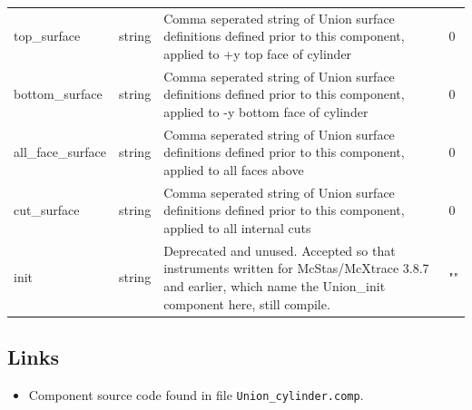 \begin{longtable}{p{}p{}p{}p{}}
top\_surface & string & Comma seperated string of Union surface definitions defined prior to this component, applied to +y top face of cylinder & 0 \\
bottom\_surface & string & Comma seperated string of Union surface definitions defined prior to this component, applied to -y bottom face of cylinder & 0 \\
all\_face\_surface & string & Comma seperated string of Union surface definitions defined prior to this component, applied to all faces above & 0 \\
cut\_surface & string & Comma seperated string of Union surface definitions defined prior to this component, applied to all internal cuts & 0 \\
init & string & Deprecated and unused. Accepted so that instruments written for McStas/McXtrace 3.8.7 and earlier, which name the Union\_init component here, still compile. & "" \\
\bottomrule
\end{longtable}

\subsection*{Links}
\begin{itemize}
  \item Component source code found in file \texttt{Union\_cylinder.comp}.
\end{itemize}
